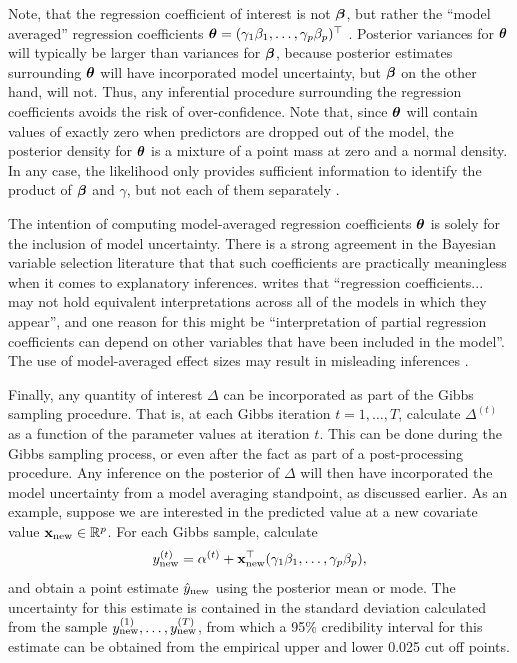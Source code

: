\documentclass[11pt,twoside,openright]{report}
\begin{document}
Note, that the regression coefficient of interest is not ${\bm\beta}$, but rather the ``model averaged'' regression coefficients ${\bm\theta} = (\gamma_1\beta_1,\dots,\gamma_p\beta_p)^\top$ \citep{madigan1994model}.
Posterior variances for ${\bm\theta}$ will typically be larger than variances for ${\bm\beta}$, because posterior estimates surrounding ${\bm\theta}$ will have incorporated model uncertainty, but ${\bm\beta}$ on the other hand, will not.
Thus, any inferential procedure surrounding the regression coefficients avoids the risk of over-confidence.
Note that, since ${\bm\theta}$ will contain values of exactly zero when predictors are dropped out of the model, the posterior density for ${\bm\theta}$ is a mixture of a point mass at zero and a normal density.
In any case, the likelihood only provides sufficient information to identify the product of ${\bm\beta}$ and $\gamma$, but not each of them separately \citep{Kuo1998}.

\label{errata19}
\begin{remark}
  The intention of computing model-averaged regression coefficients ${\bm\theta}$ is solely for the inclusion of model uncertainty.  
  There is a strong agreement in the Bayesian variable selection literature that that such coefficients are practically meaningless when it comes to explanatory inferences.
  \citet{banner2017considerations} writes that ``regression coefficients... may not hold equivalent interpretations across all of the models in which they appear'', and one reason for this might be ``interpretation of partial regression coefficients can depend on other variables that have been included in the model''.
  The use of model-averaged effect sizes may result in misleading inferences \citep{cade2015model}.
\end{remark}

Finally, any quantity of interest $\Delta$ can be incorporated as part of the Gibbs sampling procedure.
That is, at each Gibbs iteration $t=1,\dots,T$, calculate $\Delta^{(t)}$ as a function of the parameter values at iteration $t$.
This can be done during the Gibbs sampling process, or even after the fact as part of a post-processing procedure.
Any inference on the posterior of $\Delta$ will then have incorporated the model uncertainty from a model averaging standpoint, as discussed earlier.
As an example, suppose we are interested in the predicted value at a new covariate value ${\mathbf x}_\text{new} \in \mathbb{R}^p$.
For each Gibbs sample, calculate
\[
  y_{\text{new}}^{(t)} = \alpha^{(t)} + {\mathbf x}_\text{new}^\top (\gamma_1\beta_1,\dots,\gamma_p\beta_p),
\]
and obtain a point estimate $\hat y_{\text{new}}$ using the posterior mean or mode.
The uncertainty for this estimate is contained in the standard deviation calculated from the sample $y_{\text{new}}^{(1)},\dots,y_{\text{new}}^{(T)}$, from which a 95\% credibility interval for this estimate can be obtained from the empirical upper and lower 0.025 cut off points.
\end{document}

